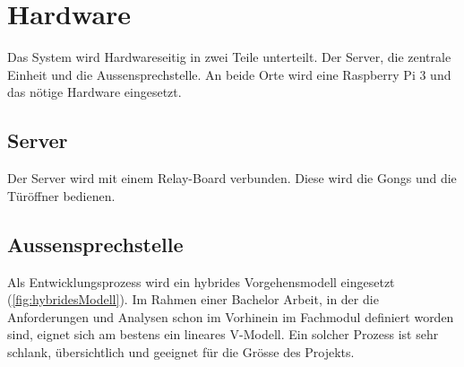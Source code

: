 \section{Hardware}
\label{sec:chapterexample}

Das System wird Hardwareseitig in zwei Teile unterteilt. Der Server, die zentrale Einheit und die Aussensprechstelle. An beide Orte wird eine Raspberry Pi 3 und das nötige Hardware eingesetzt.

\subsection{Server}
\label{sec:chapterexample}

Der Server wird mit einem Relay-Board verbunden. Diese wird die Gongs und die Türöffner bedienen.

\subsection{Aussensprechstelle}
\label{sec:chapterexample}

Als Entwicklungsprozess wird ein hybrides Vorgehensmodell eingesetzt (\ref{fig:hybridesModell}). Im Rahmen einer Bachelor Arbeit, in der die Anforderungen und Analysen schon im Vorhinein im Fachmodul definiert worden sind, eignet sich am bestens ein lineares V-Modell. Ein solcher Prozess ist sehr schlank, übersichtlich und geeignet für die Grösse des Projekts.